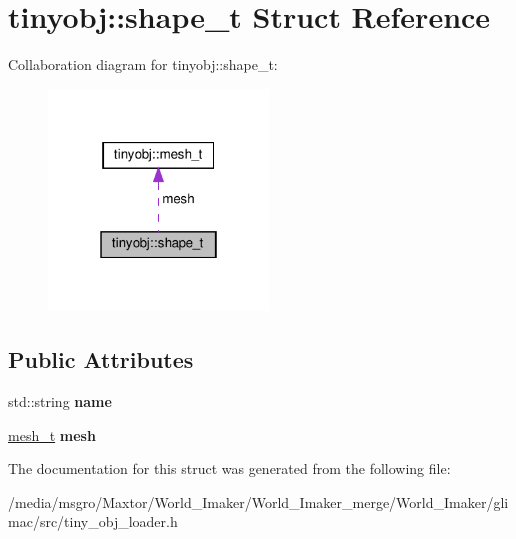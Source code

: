 \hypertarget{structtinyobj_1_1shape__t}{}\section{tinyobj\+:\+:shape\+\_\+t Struct Reference}
\label{structtinyobj_1_1shape__t}


Collaboration diagram for tinyobj\+:\+:shape\+\_\+t\+:
\nopagebreak
\begin{figure}[H]
\begin{center}
\leavevmode
\includegraphics[width=166pt]{structtinyobj_1_1shape__t__coll__graph}
\end{center}
\end{figure}
\subsection*{Public Attributes}
\begin{DoxyCompactItemize}
\item 
\mbox{\label{structtinyobj_1_1shape__t_a98650e2e66d00934f68de88eafb34630}} 
std\+::string {\bfseries name}
\item 
\mbox{\label{structtinyobj_1_1shape__t_a3dacb06dfbfe9e245ff4bc7b5b3d9818}} 
\hyperlink{structtinyobj_1_1mesh__t}{mesh\+\_\+t} {\bfseries mesh}
\end{DoxyCompactItemize}


The documentation for this struct was generated from the following file\+:\begin{DoxyCompactItemize}
\item 
/media/msgro/\+Maxtor/\+World\+\_\+\+Imaker/\+World\+\_\+\+Imaker\+\_\+merge/\+World\+\_\+\+Imaker/glimac/src/tiny\+\_\+obj\+\_\+loader.\+h\end{DoxyCompactItemize}
